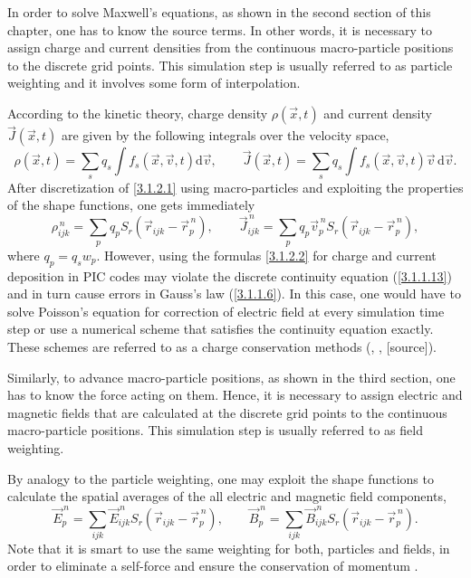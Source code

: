 In order to solve Maxwell's equations, as shown in the second section of this chapter, one has to know the source terms. In other words, it is necessary to assign charge and current densities from the continuous macro-particle positions to the discrete grid points. This simulation step is usually referred to as particle weighting and it involves some form of interpolation.
 
According to the kinetic theory, charge density $ \rho\left(\vec{x}, t \right) $ and current density $ \vec{J}\left(\vec{x}, t \right) $ are given by the following integrals over the velocity space,
\begin{equation}
\label{3.1.2.1}
\rho\left(\vec{x}, t \right) = \sum_s q_s \int f_s \left(\vec{x}, \vec{v}, t \right) \mathrm{d} \vec{v}, \qquad \vec{J}\left(\vec{x}, t \right) = \sum_s q_s \int f_s \left(\vec{x}, \vec{v}, t \right) \vec{v} \, \mathrm{d} \vec{v}.
\end{equation}
After discretization of \ref{3.1.2.1} using macro-particles and exploiting the properties of the shape functions, one gets immediately
\begin{equation}
\label{3.1.2.2}
\rho_{ijk}^{\,n} = \sum_{p} q_p S_{r}\left(\vec{r}_{ijk} - \vec{r}_{p}^{\,n}\right), \qquad \vec{J}_{ijk}^{\,n} = \sum_{p} q_p \vec{v}_p^{\,n} S_{r}\left(\vec{r}_{ijk} - \vec{r}_{p}^{\,n}\right),
\end{equation}
where $ q_p = q_s w_p $. However, using the formulas \ref{3.1.2.2} for charge and current deposition in PIC codes may violate the discrete continuity equation (\ref{3.1.1.13}) and in turn cause errors in Gauss's law (\ref{3.1.1.6}). In this case, one would have to solve Poisson's equation for correction of electric field at every simulation time step or use a numerical scheme that satisfies the continuity equation exactly. These schemes are referred to as a charge conservation methods (\cite{villasenor}, \cite{esirkepov}, [source]).

Similarly, to advance macro-particle positions, as shown in the third section, one has to know the force acting on them. Hence, it is necessary to assign electric and magnetic fields that are calculated at the discrete grid points to the continuous macro-particle positions. This simulation step is usually referred to as field weighting.

By analogy to the particle weighting, one may exploit the shape functions to calculate the spatial averages of the all electric and magnetic field components,
\begin{equation}
\vec{E}_{p}^{\,n} = \sum_{ijk} \vec{E}_{ijk}^{\,n} S_{r}\left(\vec{r}_{ijk} - \vec{r}_{p}^{\,n}\right), \qquad \vec{B}_{p}^{\,n} = \sum_{ijk} \vec{B}_{ijk}^{\,n} S_{r}\left(\vec{r}_{ijk} - \vec{r}_{p}^{\,n}\right).
\end{equation}
Note that it is smart to use the same weighting for both, particles and fields, in order to eliminate a self-force and ensure the conservation of momentum \cite{fehske}.

